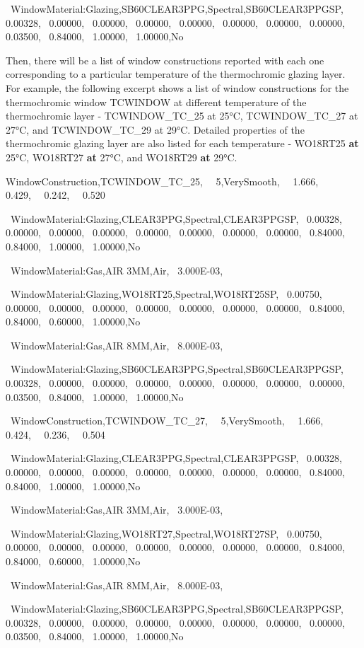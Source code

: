 ~WindowMaterial:Glazing,SB60CLEAR3PPG,Spectral,SB60CLEAR3PPGSP,~ 0.00328,~ 0.00000,~ 0.00000,~ 0.00000,~ 0.00000,~ 0.00000,~ 0.00000,~ 0.00000,~ 0.03500,~ 0.84000,~ 1.00000,~ 1.00000,No

Then, there will be a list of window constructions reported with each one corresponding to a particular temperature of the thermochromic glazing layer. For example, the following excerpt shows a list of window constructions for the thermochromic window TCWINDOW at different temperature of the thermochromic layer - TCWINDOW\_TC\_25 at 25°C, TCWINDOW\_TC\_27 at 27°C, and TCWINDOW\_TC\_29 at 29°C. Detailed properties of the thermochromic glazing layer are also listed for each temperature - WO18RT25 \textbf{at} 25°C, WO18RT27 \textbf{at} 27°C, and WO18RT29 \textbf{at} 29°C.

WindowConstruction,TCWINDOW\_TC\_25,~~ 5,VerySmooth,~~ 1.666,~~ 0.429,~~ 0.242,~~ 0.520

~WindowMaterial:Glazing,CLEAR3PPG,Spectral,CLEAR3PPGSP,~ 0.00328,~ 0.00000,~ 0.00000,~ 0.00000,~ 0.00000,~ 0.00000,~ 0.00000,~ 0.00000,~ 0.84000,~ 0.84000,~ 1.00000,~ 1.00000,No

~WindowMaterial:Gas,AIR 3MM,Air,~ 3.000E-03,

~WindowMaterial:Glazing,WO18RT25,Spectral,WO18RT25SP,~ 0.00750,~ 0.00000,~ 0.00000,~ 0.00000,~ 0.00000,~ 0.00000,~ 0.00000,~ 0.00000,~ 0.84000,~ 0.84000,~ 0.60000,~ 1.00000,No

~WindowMaterial:Gas,AIR 8MM,Air,~ 8.000E-03,

~WindowMaterial:Glazing,SB60CLEAR3PPG,Spectral,SB60CLEAR3PPGSP,~ 0.00328,~ 0.00000,~ 0.00000,~ 0.00000,~ 0.00000,~ 0.00000,~ 0.00000,~ 0.00000,~ 0.03500,~ 0.84000,~ 1.00000,~ 1.00000,No

~WindowConstruction,TCWINDOW\_TC\_27,~~ 5,VerySmooth,~~ 1.666,~~ 0.424,~~ 0.236,~~ 0.504

~WindowMaterial:Glazing,CLEAR3PPG,Spectral,CLEAR3PPGSP,~ 0.00328,~ 0.00000,~ 0.00000,~ 0.00000,~ 0.00000,~ 0.00000,~ 0.00000,~ 0.00000,~ 0.84000,~ 0.84000,~ 1.00000,~ 1.00000,No

~WindowMaterial:Gas,AIR 3MM,Air,~ 3.000E-03,

~WindowMaterial:Glazing,WO18RT27,Spectral,WO18RT27SP,~ 0.00750,~ 0.00000,~ 0.00000,~ 0.00000,~ 0.00000,~ 0.00000,~ 0.00000,~ 0.00000,~ 0.84000,~ 0.84000,~ 0.60000,~ 1.00000,No

~WindowMaterial:Gas,AIR 8MM,Air,~ 8.000E-03,

~WindowMaterial:Glazing,SB60CLEAR3PPG,Spectral,SB60CLEAR3PPGSP,~ 0.00328,~ 0.00000,~ 0.00000,~ 0.00000,~ 0.00000,~ 0.00000,~ 0.00000,~ 0.00000,~ 0.03500,~ 0.84000,~ 1.00000,~ 1.00000,No

